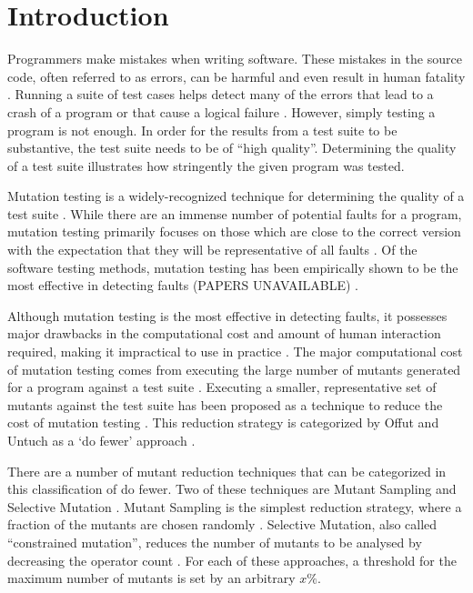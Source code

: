 \section{Introduction}
Programmers make mistakes when writing software.
These mistakes in the source code, often referred to as errors, can be harmful
and even result in human fatality \cite{vicente2003programming}.
Running a suite of test cases helps detect many of the errors
that lead to a crash of a program or that cause a logical failure \cite{wagner2005comparing}.
However, simply testing a program is not enough. In order for the results
from a test suite to be substantive, the test suite needs to be of ``high quality''.
Determining the quality of a test suite illustrates how stringently the given
program was tested.

Mutation testing is a widely-recognized technique for determining the quality
of a test suite \cite{gopinath2015mutation}. While there are an immense number
of potential faults for a program, mutation testing primarily focuses on those
which are close to the correct version with the expectation that they will
be representative of all faults \cite{jia2011analysis}.
Of the software testing methods, mutation testing has been empirically
shown to be the most effective in detecting faults (PAPERS UNAVAILABLE) \cite{PAPERS UNAVAILABLE}.

Although mutation testing is the most effective in detecting faults, it possesses
major drawbacks in the computational cost and amount of human interaction required, making it
impractical to use in practice \cite{gopinath2015mutation, wong1995reducing, gopinath2015empirical}.
The major computational cost of mutation testing comes from executing the large number of mutants generated for a
program against a test suite \cite{offutt1993experimental}. Executing a smaller, representative
set of mutants against the test suite has been proposed as a technique to reduce
the cost of mutation testing \cite{jia2011analysis, wong1995reducing, offutt1993experimental, offutt2001mutation}.
This reduction strategy is categorized by Offut and Untuch as a `do fewer' approach \cite{offutt2001mutation}.

There are a number of mutant reduction techniques that can be categorized in this
classification of do fewer. Two of these techniques are Mutant Sampling and Selective Mutation \cite{jia2011analysis, wong1995reducing, offutt1993experimental}.
Mutant Sampling is the simplest reduction strategy, where a fraction of the mutants
are chosen randomly \cite{wong1995reducing}. Selective Mutation, also called ``constrained mutation'',
reduces the number of mutants to be analysed by decreasing the operator count \cite{jia2011analysis, offutt1993experimental, mathur1991performance}.
For each of these approaches, a threshold for the maximum number of mutants is set by an arbitrary \(x\%\).

